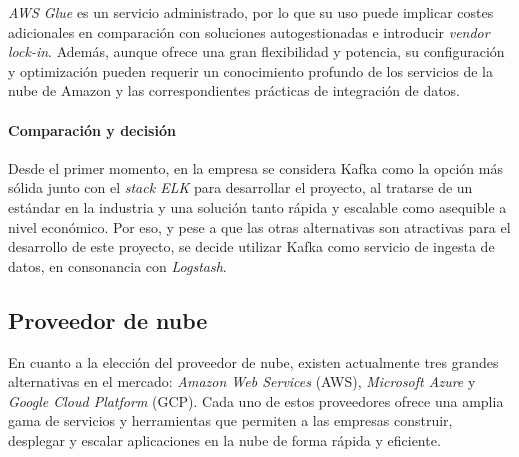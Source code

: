 \textit{AWS Glue} es un servicio administrado, por lo que su uso puede implicar
costes adicionales en comparación con soluciones autogestionadas e introducir
\textit{vendor lock-in}. Además, aunque ofrece una gran flexibilidad y potencia,
su configuración y optimización pueden requerir un conocimiento profundo de los
servicios de la nube de Amazon y las correspondientes prácticas de integración
de datos.


\paragraph{Comparación y decisión}
Desde el primer momento, en la empresa se considera Kafka como la opción más
sólida junto con el \textit{stack ELK} para desarrollar el proyecto, al
tratarse de un estándar en la industria y una solución tanto rápida y escalable
como asequible a nivel económico. Por eso, y pese a que las otras alternativas
son atractivas para el desarrollo de este proyecto, se decide utilizar Kafka
como servicio de ingesta de datos, en consonancia con \textit{Logstash}.


\subsection{Proveedor de nube}\label{subsec:proveedor}
En cuanto a la elección del proveedor de nube, existen actualmente tres
grandes alternativas en el mercado: \textit{Amazon Web Services} (AWS),
\textit{Microsoft Azure} y \textit{Google Cloud Platform} (GCP). Cada uno de
estos proveedores ofrece una amplia gama de servicios y herramientas que
permiten a las empresas construir, desplegar y escalar aplicaciones en la nube
de forma rápida y eficiente.

